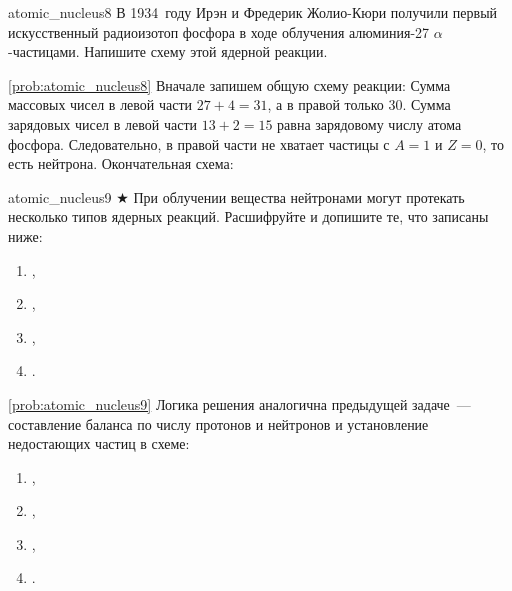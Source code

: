 \begin{problem}{}{atomic_nucleus8}
    В 1934~году Ирэн и Фредерик Жолио-Кюри получили первый искусственный радиоизотоп фосфора  в ходе облучения алюминия-27 $\alpha$-частицами. Напишите схему этой ядерной реакции.

    \begin{sol}{\ref{prob:atomic_nucleus8}}
        Вначале запишем общую схему реакции:
        Сумма массовых чисел в левой части $27 + 4 = 31$, а в правой только 30. Сумма зарядовых чисел в левой части $13 + 2 = 15$ равна зарядовому числу атома фосфора. Следовательно, в правой части не хватает частицы с $A = 1$ и $Z = 0$, то есть нейтрона. Окончательная схема:
    \end{sol}
\end{problem}

\begin{problem}{}{atomic_nucleus9}
    $\bigstar$ При облучении вещества нейтронами могут протекать несколько типов ядерных реакций. Расшифруйте и допишите те, что записаны ниже:
    \begin{enumerate}[label=\arabic*)]
        \item {},
        \item {},
        \item {},
        \item {}.
    \end{enumerate}

    \begin{sol}{\ref{prob:atomic_nucleus9}}
        Логика решения аналогична предыдущей задаче~--- составление баланса по числу протонов и нейтронов и установление недостающих частиц в схеме:
        \begin{enumerate}[label=\arabic*)]
            \item {},
            \item {},
            \item {},
            \item {}.
        \end{enumerate}
    \end{sol}
\end{problem}

